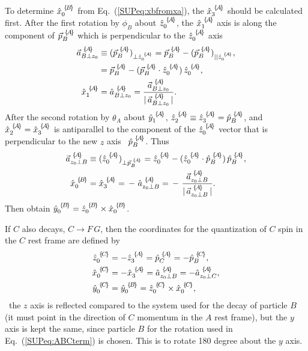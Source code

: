 To determine ${\hat{x}}_{{0}}^{\,\,\{\!B\!\}}$
from Eq.~(\ref{SUPeq:xbfromxa}), 
the ${\hat{x}}_{{3}}^{\,\,\{\!A\!\}}$ should be calculated first.
After the first rotation by $\phi_B$ about ${\hat{z}}_{{0}}^{\,\,\{\!A\!\}}$,
the ${\hat{x}}_{{1}}^{\,\,\{\!A\!\}}$ axis is along the component of
${\vec{p}}_{{B}}^{\,\,\{\!A\!\}}$ which is perpendicular to the ${\hat{z}}_{{0}}^{\,\,\{\!A\!\}}$ axis
\begin{align}
\BA{\vec{a}}{B\perp z_0}{A} & \equiv (\BA{\vec{p}}{B}{A})_{\perp \BA{\hat{z}}{0}{A}}
                    = {\BA{\vec{p}}{B}{A}} - (\BA{\vec{p}}{B}{A})_{|| \BA{\hat{z}}{0}{A}}, \notag\\
                   & = {\BA{\vec{p}}{B}{A}} - ({\BA{\vec{p}}{B}{A}}\cdot\BA{\hat{z}}{0}{A})\,\BA{\hat{z}}{0}{A}, \notag\\
\BA{\hat{x}}{1}{A} & = \BA{\hat{a}}{B\perp z_0}{A} = \frac{\BA{\vec{a}}{B\perp z_0}{A}}{|\,\BA{\vec{a}}{B\perp z_0}{A}\,|}.
\label{SUPeq:xonea}
\end{align}
After the second rotation by $\theta_A$ about ${\hat{y}}_{{1}}^{\,\,\{\!A\!\}}$,
${\hat{z}}_{{2}}^{\,\,\{\!A\!\}}\equiv {\hat{z}}_{{3}}^{\,\,\{\!A\!\}} = {\hat{p}}_{{B}}^{\,\,\{\!A\!\}}$, 
and
${\hat{x}}_{{2}}^{\,\,\{\!A\!\}}= {\hat{x}}_{{3}}^{\,\,\{\!A\!\}}$ is antiparallel to the component of the ${\hat{z}}_{{0}}^{\,\,\{\!A\!\}}$ vector that is perpendicular to the new $z$ axis \ie\ ${\hat{p}}_{{B}}^{\,\,\{\!A\!\}}$. 
Thus
\begin{align}
\BA{\vec{a}}{z_0\perp B}{A} & \equiv
(\BA{\hat{z}}{0}{A})_{\perp \BA{\vec{p}}{B}{A}}
                    = {\BA{\hat{z}}{0}{A}} - ({\BA{\hat{z}}{0}{A}}\cdot\BA{\hat{p}}{B}{A})\,\BA{\hat{p}}{B}{A}, \notag\\
\BA{\hat{x}}{0}{B} &=
\BA{\hat{x}}{3}{A}  = \,-\,\, \BA{\hat{a}}{z_0\perp B}{A} = \,-\,\,\frac{\BA{\vec{a}}{z_0\perp B}{A}}{|\,\BA{\vec{a}}{z_0\perp B}{A}\,|}.
\label{SUPeq:xaxis}
\end{align}
Then obtain ${\hat{y}}_{{0}}^{\,\,\{\!B\!\}}={\hat{z}}_{{0}}^{\,\,\{\!B\!\}}\times{\hat{x}}_{{0}}^{\,\,\{\!B\!\}}$.

If $C$ also decays, $C\to F\, G$, then the coordinates for the quantization of $C$ spin
in the $C$ rest frame are defined by
\begin{align}
\BA{\hat{z}}{0}{C} & = - \BA{\hat{z}}{3}{A} = \BA{\hat{p}}{C}{A} = - \BA{\hat{p}}{B}{C}, \\
\BA{\hat{x}}{0}{C} & =  \BA{-\hat{x}}{3}{A} = \BA{\hat{a}}{z_0\perp B}{A} = \BA{-\hat{a}}{z_0\perp C}{A}, \label{SUPeq:xcaxis} \\
   \BA{\hat{y}}{0}{C} & = \BA{\hat{y}}{0}{B} = \BA{\hat{z}}{0}{C}\times\BA{\hat{x}}{0}{C},
\label{SUPeq:xcfromxa}
\end{align}
\ie\ the $z$ axis is reflected compared to the system used for the decay of particle $B$
(it must point in the direction of $C$ momentum in the $A$ rest frame),
but the $y$ axis is kept the same, 
since particle $B$ for the rotation used in Eq.~(\ref{SUPeq:ABCterm}) is chosen.
This is to rotate 180 degree about the $y$ axis.



